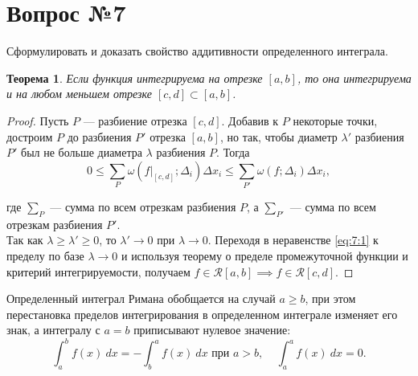 \documentclass[12pt]{report}
\numberwithin{equation}{section}
\newtheorem{theorem}{Теорема}[section]
\begin{document}
\newpage \section{Вопрос №7} %

\begin{framed}
Сформулировать и доказать свойство аддитивности определенного интеграла.
\end{framed}

\begin{theorem} \label{th:7:1}
Если функция интегрируема на отрезке $[a,b]$, то она интегрируема и на любом меньшем отрезке $[c,d] \subset [a,b]$.
\end{theorem}
\begin{proof}
Пусть $P$ --- разбиение отрезка $[c,d]$. Добавив к $P$ некоторые точки, достроим $P$ до разбиения $P'$ отрезка $[a,b]$, но так, чтобы диаметр $\lambda'$ разбиения $P'$ был не больше диаметра $\lambda$ разбиения $P$. Тогда
\begin{equation}\label{eq:7:1}
0 \leqslant \sum_{P} \omega(f |_{[c,d]}; \Delta_i) \Delta x_i \leqslant \sum_{P'} \omega(f; \Delta_i) \Delta x_i, 
\end{equation}

где $\sum\limits_{P}$ --- сумма по всем отрезкам разбиения $P$, а $\sum\limits_{P'}$ --- сумма по всем отрезкам разбиения $P'$.\\

Так как $\lambda \geqslant \lambda' \geqslant 0$, то $\lambda' \to 0$ при $\lambda \to 0$. Переходя в неравенстве \eqref{eq:7:1} к пределу по базе $\lambda \to 0$ и используя теорему о пределе промежуточной функции и критерий интегрируемости, получаем $f \in \mathcal{R} [a,b] \implies f \in \mathcal{R} [c,d].$
\end{proof}

Определенный интеграл Римана обобщается на случай $a \geqslant b$, при этом перестановка пределов интегрирования в определенном интеграле изменяет его знак, а интегралу с $a = b$ приписывают нулевое значение:
\begin{equation}\label{eq:7:2}
\int_a^b f(x)~dx = - \int_b^a f(x)~dx \text{ при } a > b, ~~~~~ \int_a^a f(x)~dx = 0.
\end{equation}
\end{document}
